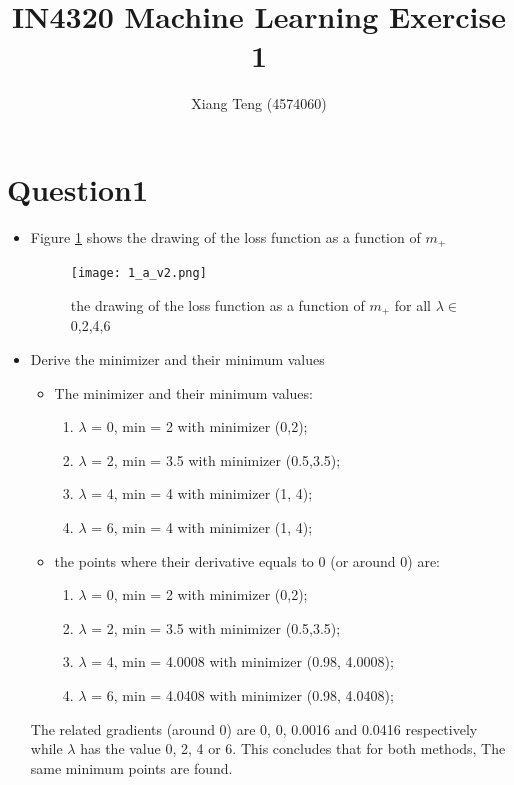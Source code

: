 \documentclass[a4paper,10pt]{article}
\title{IN4320 Machine Learning Exercise 1}
\author{Xiang Teng (4574060)}
\begin{document}
\maketitle


\section{Question1}
\begin{itemize}
    \item Figure \ref{fig:loss function} shows the drawing of the loss function as a function of $m_+$
        \begin{figure}[h]
        \centering
            \texttt{[image: 1\_a\_v2.png]}
                \caption{the drawing of the loss function as a function of $m_+$ for all $\lambda \in $ {0,2,4,6}}
                \label{fig:loss function}
        \end{figure}
    \item Derive the minimizer and their minimum values
    \begin{itemize}
        \item The minimizer and their minimum values:
        \begin{enumerate}
            \item $\lambda$ = 0, min = 2 with minimizer (0,2);
            \item $\lambda$ = 2, min = 3.5 with minimizer (0.5,3.5);
            \item $\lambda$ = 4, min = 4 with minimizer (1, 4);
            \item $\lambda$ = 6, min = 4 with minimizer (1, 4);
    \end{enumerate}
        \item the points where their derivative equals to 0 (or around 0) are:
        \begin{enumerate}
            \item $\lambda$ = 0, min = 2 with minimizer (0,2);
            \item $\lambda$ = 2, min = 3.5 with minimizer (0.5,3.5);
            \item $\lambda$ = 4, min = 4.0008 with minimizer (0.98, 4.0008);
            \item $\lambda$ = 6, min = 4.0408 with minimizer (0.98, 4.0408); 
        \end{enumerate} 
    \end{itemize}
    
      The related gradients (around 0) are 0, 0, 0.0016 and 0.0416 respectively while $\lambda$ has the value 0, 2, 4 or 6. This concludes that for both methods, The same minimum points are found.
    
\end{itemize}
\newpage
\end{document}
